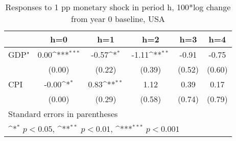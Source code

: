\begin{table}[htbp]\centering
\def\sym#1{\ifmmode^{#1}\else\(^{#1}\)\fi}
\caption{Responses to 1 pp monetary shock in period h, 100*log change from year 0 baseline, USA}
\begin{tabular}{l*{5}{c}}
\hline\hline
            &\multicolumn{1}{c}{h=0}&\multicolumn{1}{c}{h=1}&\multicolumn{1}{c}{h=2}&\multicolumn{1}{c}{h=3}&\multicolumn{1}{c}{h=4}\\
\hline
GDP"        &        0.00\sym{***}&       -0.57\sym{*}  &       -1.11\sym{**} &       -0.91         &       -0.75         \\
            &      (0.00)         &      (0.22)         &      (0.39)         &      (0.52)         &      (0.60)         \\
[1em]
CPI         &       -0.00\sym{*}  &        0.83\sym{**} &        1.12         &        0.39         &        0.17         \\
            &      (0.00)         &      (0.29)         &      (0.58)         &      (0.74)         &      (0.79)         \\
\hline\hline
\multicolumn{6}{l}{\footnotesize Standard errors in parentheses}\\
\multicolumn{6}{l}{\footnotesize \sym{*} \(p<0.05\), \sym{**} \(p<0.01\), \sym{***} \(p<0.001\)}\\
\end{tabular}
\end{table}
